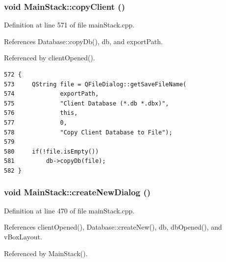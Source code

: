 \hypertarget{classMainStack_k4}{
\subsubsection[copyClient]{\setlength{\rightskip}{0pt plus 5cm}void Main\-Stack::copy\-Client ()}}
\label{classMainStack_k4}


Definition at line 571 of file main\-Stack.cpp.

References Database::copy\-Db(), db, and export\-Path.

Referenced by client\-Opened().

\footnotesize\begin{verbatim}572 {
573     QString file = QFileDialog::getSaveFileName(
574             exportPath,
575             "Client Database (*.db *.dbx)",
576             this,
577             0,
578             "Copy Client Database to File");
579     
580     if(!file.isEmpty())
581         db->copyDb(file);
582 }
\end{verbatim}\normalsize 


\hypertarget{classMainStack_k2}{
\subsubsection[createNewDialog]{\setlength{\rightskip}{0pt plus 5cm}void Main\-Stack::create\-New\-Dialog ()}}
\label{classMainStack_k2}


Definition at line 470 of file main\-Stack.cpp.

References client\-Opened(), Database::create\-New(), db, db\-Opened(), and v\-Box\-Layout.

Referenced by Main\-Stack().

